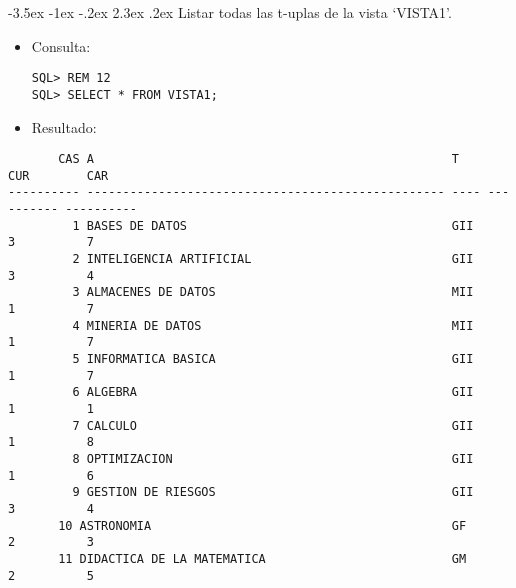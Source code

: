 \documentclass[11pt]{report}
\makeatletter
\renewcommand\chapter{\@startsection{chapter}{0}{\z@}%
    {-3.5ex \@plus -1ex \@minus -.2ex}%
    {2.3ex \@plus.2ex}%
    {\normalfont\Large\bfseries}}
\makeatother
\begin{document}
\chapter{Listar todas las t-uplas de la vista ‘VISTA1’.}
\begin{itemize}
  \item Consulta:
  \begin{verbatim}
SQL> REM 12
SQL> SELECT * FROM VISTA1;
  \end{verbatim}
  \item{Resultado:}
\end{itemize}
  \begin{verbatim}
       CAS A                                                  T           CUR        CAR                                                                                            
---------- -------------------------------------------------- ---- ---------- ----------                                                                                            
         1 BASES DE DATOS                                     GII           3          7                                                                                            
         2 INTELIGENCIA ARTIFICIAL                            GII           3          4                                                                                            
         3 ALMACENES DE DATOS                                 MII           1          7                                                                                            
         4 MINERIA DE DATOS                                   MII           1          7                                                                                            
         5 INFORMATICA BASICA                                 GII           1          7                                                                                            
         6 ALGEBRA                                            GII           1          1                                                                                            
         7 CALCULO                                            GII           1          8                                                                                            
         8 OPTIMIZACION                                       GII           1          6                                                                                            
         9 GESTION DE RIESGOS                                 GII           3          4                                                                                            
       10 ASTRONOMIA                                          GF            2          3                                                                                            
       11 DIDACTICA DE LA MATEMATICA                          GM            2          5                                                                                            


\end{verbatim}
\end{document}
